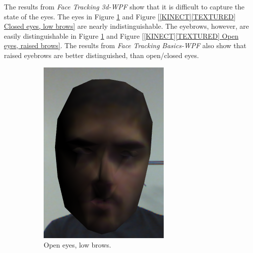 The results from \textit{Face Tracking 3d-WPF} show that it is difficult to capture the state of the eyes.
The eyes in Figure \ref{[KINECT][TEXTURED] Open eyes, low brows} and Figure \ref{[KINECT][TEXTURED] Closed eyes, low brows} are nearly indistinguishable.
The eyebrows, however, are easily distinguishable in Figure \ref{[KINECT][TEXTURED] Open eyes, low brows} and Figure \ref{[KINECT][TEXTURED] Open eyes, raised brows}.
The results from \textit{Face Tracking Basics-WPF} also show that raised eyebrows are better distinguished, than open/closed eyes.

\begin{figure}[H]
	\centering
	\begin{subfigure}{.3\textwidth}
		\centering
		\includegraphics[width=0.8\linewidth]{sections/analysis/sensorselection/kinect/texture_no_face}
		\caption{Open eyes, low brows.}\label{[KINECT][TEXTURED] Open eyes, low brows}
	\end{subfigure}\hfill
	\begin{subfigure}{.3\textwidth}
		\centering

\end{subfigure}
\end{figure}
